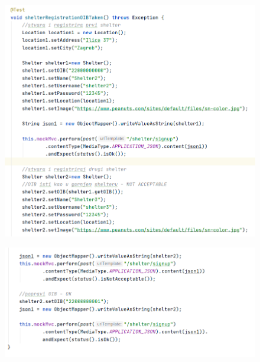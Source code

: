		
			\begin{figure}[H]
				\centerline{
			 	\includegraphics[scale=0.75]{slike/shelter1.1.PNG}} %
			 	\centering
			 \end{figure}
			 \begin{figure}[H]
			 	\centerline{
			 	\includegraphics[scale=0.75]{slike/shelter1.2.PNG}} %
			 	\centering
			 \end{figure}
		 
		 
		 
